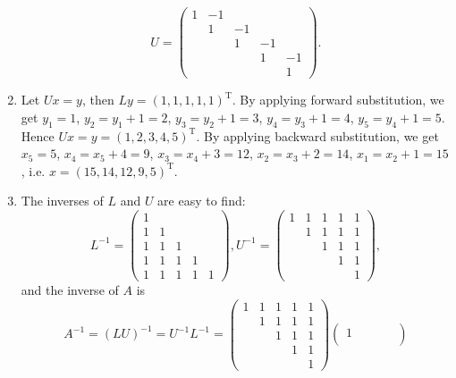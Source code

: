 \documentclass[a4paper,11pt]{article}
\begin{document}
\begin{enumerate}
$$         U = \begin{pmatrix}
               1 & -1 &  &  &  \\
                & 1 & -1 &  &  \\
                &  & 1 & -1 &  \\
                &  &  & 1 & -1 \\
                &  &  &  & 1
             \end{pmatrix}. $$
      \item Let $Ux = y$, then $Ly = (1, 1, 1, 1, 1)^{\text{T}}$. By applying forward substitution, we get $y_1 = 1$, $y_2 = y_1 + 1 = 2$, $y_3 = y_2 + 1 = 3$, $y_4 = y_3 + 1 = 4$, $y_5 = y_4+1 = 5$. Hence $Ux = y = (1, 2, 3, 4, 5)^{\text{T}}$. By applying backward substitution, we get $x_5 = 5$, $x_4 = x_5+4 = 9$, $x_3 = x_4+3 = 12$, $x_2 = x_3 + 2 = 14$, $x_1 = x_2 + 1 = 15$, i.e. $x = (15, 14, 12 ,9, 5)^{\text{T}}$.
      \item The inverses of $L$ and $U$ are easy to find:
      $$ L^{-1} = 
          \begin{pmatrix}
            1 &  &  &  &  \\
            1 & 1 &  &  &  \\
            1 & 1 & 1 &  &  \\
            1 & 1 & 1 & 1 &  \\
            1 & 1 & 1 & 1 & 1
          \end{pmatrix},
           U^{-1} =
          \begin{pmatrix}
            1 & 1 & 1 & 1 & 1 \\
             & 1 & 1 & 1 & 1 \\
             &  & 1 & 1 & 1 \\
             &  &  & 1 & 1 \\
             &  &  &  & 1
          \end{pmatrix}, $$
          and the inverse of $A$ is 
          $$ A^{-1} = (LU)^{-1} = U^{-1}L^{-1} = 
          \begin{pmatrix}
            1 & 1 & 1 & 1 & 1 \\
             & 1 & 1 & 1 & 1 \\
             &  & 1 & 1 & 1 \\
             &  &  & 1 & 1 \\
             &  &  &  & 1
          \end{pmatrix}
          \begin{pmatrix}
            1 &  &  &  &  \\

\end{pmatrix}$$
\end{enumerate}
\end{document}
